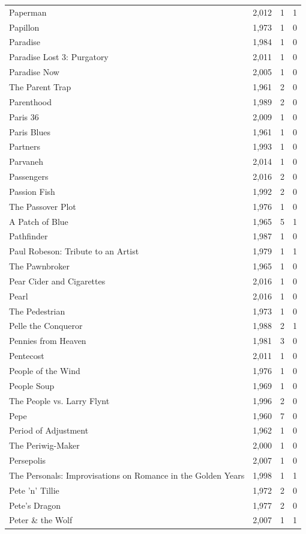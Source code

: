 \begin{tabular}{lrrr}
Paperman & 2,012 & 1 & 1 \\
Papillon & 1,973 & 1 & 0 \\
Paradise & 1,984 & 1 & 0 \\
Paradise Lost 3: Purgatory & 2,011 & 1 & 0 \\
Paradise Now & 2,005 & 1 & 0 \\
The Parent Trap & 1,961 & 2 & 0 \\
Parenthood & 1,989 & 2 & 0 \\
Paris 36 & 2,009 & 1 & 0 \\
Paris Blues & 1,961 & 1 & 0 \\
Partners & 1,993 & 1 & 0 \\
Parvaneh & 2,014 & 1 & 0 \\
Passengers & 2,016 & 2 & 0 \\
Passion Fish & 1,992 & 2 & 0 \\
The Passover Plot & 1,976 & 1 & 0 \\
A Patch of Blue & 1,965 & 5 & 1 \\
Pathfinder & 1,987 & 1 & 0 \\
Paul Robeson: Tribute to an Artist & 1,979 & 1 & 1 \\
The Pawnbroker & 1,965 & 1 & 0 \\
Pear Cider and Cigarettes & 2,016 & 1 & 0 \\
Pearl & 2,016 & 1 & 0 \\
The Pedestrian & 1,973 & 1 & 0 \\
Pelle the Conqueror & 1,988 & 2 & 1 \\
Pennies from Heaven & 1,981 & 3 & 0 \\
Pentecost & 2,011 & 1 & 0 \\
People of the Wind & 1,976 & 1 & 0 \\
People Soup & 1,969 & 1 & 0 \\
The People vs. Larry Flynt & 1,996 & 2 & 0 \\
Pepe & 1,960 & 7 & 0 \\
Period of Adjustment & 1,962 & 1 & 0 \\
The Periwig-Maker & 2,000 & 1 & 0 \\
Persepolis & 2,007 & 1 & 0 \\
The Personals: Improvisations on Romance in the Golden Years & 1,998 & 1 & 1 \\
Pete 'n' Tillie & 1,972 & 2 & 0 \\
Pete's Dragon & 1,977 & 2 & 0 \\
Peter \& the Wolf & 2,007 & 1 & 1 \\

\end{tabular}
